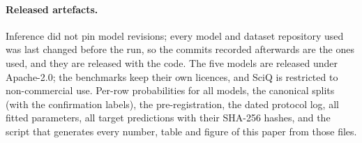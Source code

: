 \documentclass[11pt]{article}
\theoremstyle{remark}
\begin{document}
\paragraph{Released artefacts.}
Inference did not pin model revisions; every model and dataset repository used was last changed before the run, so the commits recorded afterwards are the ones used, and they are released with the code.
The five models are released under Apache-2.0; the benchmarks keep their own licences, and SciQ is restricted to non-commercial use.
Per-row probabilities for all models, the canonical splits (with the confirmation labels), the pre-registration, the dated protocol log, all fitted parameters, all target predictions with their SHA-256 hashes, and the script that generates every number, table and figure of this paper from those files.
\end{document}
